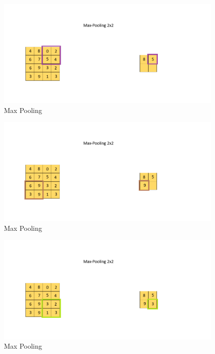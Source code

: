 \documentclass[a4paper,12pt]{report}
\begin{document}
\begin{figure}[htbp]
  \centering
  \includegraphics[width=\textwidth]{images/CNN_Max_Pooling_2.png}
  \caption{Max Pooling}
  \label{fig:fullwidth}
\end{figure}
\FloatBarrier
\begin{figure}[htbp]
  \centering
  \includegraphics[width=\textwidth]{images/CNN_Max_Pooling_3.png}
  \caption{Max Pooling}
  \label{fig:fullwidth}
\end{figure}
	
\begin{figure}[htbp]
  \centering
  \includegraphics[width=\textwidth]{images/CNN_Max_Pooling_4.png}
  \caption{Max Pooling}
  \label{fig:fullwidth}
\end{figure}
	
\end{document}
